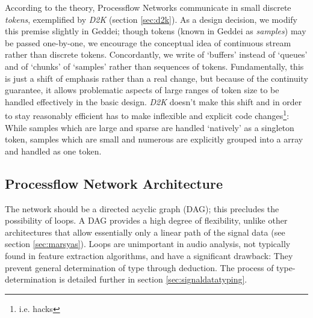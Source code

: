 
According to the theory, Processflow Networks communicate in small discrete \textit{tokens}, exemplified by \textit{D2K} (section \ref{sec:d2k}). As a design decision, we modify this premise slightly in Geddei; though tokens (known in Geddei as \textit{samples}) may be passed one-by-one, we encourage the conceptual idea of continuous stream rather than discrete tokens. Concordantly, we write of `buffers' instead of `queues' and of `chunks' of `samples' rather than sequences of tokens. Fundamentally, this is just a shift of emphasis rather than a real change, but because of the continuity guarantee, it allows problematic aspects of large ranges of token size to be handled effectively in the basic design. \textit{D2K} doesn't make this shift and in order to stay reasonably efficient has to make inflexible and explicit code changes\footnote{i.e. hacks}: While samples which are large and sparse are handled `natively' as a singleton token, samples which are small and numerous are explicitly grouped into a array and handled as one token.

\subsection{Processflow Network Architecture}

The network should be a directed acyclic graph (DAG); this precludes the possibility of loops. A DAG provides a high degree of flexibility, unlike other architectures that allow essentially only a linear path of the signal data (see section \ref{sec:marsyas}). Loops are unimportant in audio analysis, not typically found in feature extraction algorithms, and have a significant drawback: They prevent general determination of type through deduction. The process of type-determination is detailed further in section \ref{sec:signaldatatyping}.

